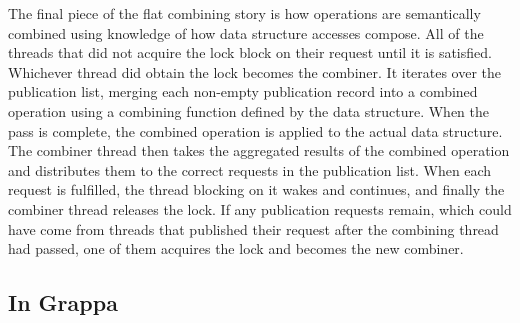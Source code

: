 The final piece of the flat combining story is how operations are semantically combined using knowledge of how data structure accesses compose. All of the threads that did not acquire the lock block on their request until it is satisfied. Whichever thread did obtain the lock becomes the combiner. It iterates over the publication list, merging each non-empty publication record into a combined operation using a combining function defined by the data structure. When the pass is complete, the combined operation is applied to the actual data structure. The combiner thread then takes the aggregated results of the combined operation and distributes them to the correct requests in the publication list. When each request is fulfilled, the thread blocking on it wakes and continues, and finally the combiner thread releases the lock. If any publication requests remain, which could have come from threads that published their request after the combining thread had passed, one of them acquires the lock and becomes the new combiner.


\subsection{In Grappa}

